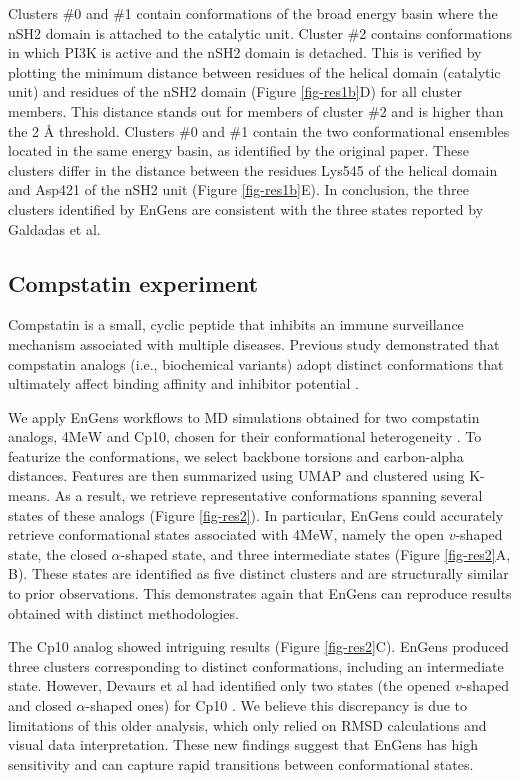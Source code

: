 \documentclass[unnumsec,webpdf,contemporary,large,numsquare]{oup-authoring-template}%
\theoremstyle{thmstyleone}%
\theoremstyle{thmstyletwo}%
\theoremstyle{thmstylethree}%
\begin{document}
Clusters \#0 and \#1 contain conformations of the broad energy basin where the nSH2 domain is attached to the catalytic unit. Cluster \#2 contains conformations in which PI3K is active and the nSH2 domain is detached. This is verified by plotting the minimum distance between residues of the helical domain (catalytic unit) and residues of the nSH2 domain (Figure \ref{fig-res1b}D) for all cluster members. This distance stands out for members of cluster \#2 and is higher than the 2 Å threshold.  Clusters \#0 and \#1 contain the two conformational ensembles located in the same energy basin, as identified by the original paper. These clusters differ in the distance between the residues Lys545 of the helical domain and Asp421 of the nSH2 unit (Figure \ref{fig-res1b}E).  In conclusion, the three clusters identified by EnGens are consistent with the three states reported by Galdadas et al.
 
\subsection{Compstatin experiment}

Compstatin is a small, cyclic peptide that inhibits an immune surveillance mechanism associated with multiple diseases. Previous study demonstrated that compstatin analogs (i.e., biochemical variants) adopt distinct conformations that ultimately affect binding affinity and inhibitor potential \citep{devaurs_computational_2020}. 

We apply EnGens workflows to MD simulations obtained for two compstatin analogs, 4MeW and Cp10, chosen for their conformational heterogeneity \citep{devaurs_computational_2020}. To featurize the conformations, we select backbone torsions and carbon-alpha distances. Features are then summarized using UMAP and clustered using K-means. As a result, we retrieve representative conformations spanning several states of these analogs (Figure \ref{fig-res2}). In particular, EnGens could accurately retrieve conformational states associated with 4MeW, namely the open $v$-shaped state, the closed $\alpha$-shaped state, and three intermediate states (Figure \ref{fig-res2}A, B). These states are identified as five distinct clusters and are structurally similar to prior observations. This demonstrates again that EnGens can reproduce results obtained with distinct methodologies. 

The Cp10 analog showed intriguing results (Figure \ref{fig-res2}C). EnGens produced three clusters corresponding to distinct conformations, including an intermediate state. However, Devaurs et al had identified only two states (the opened $v$-shaped  and closed $\alpha$-shaped ones) for Cp10 \citep{devaurs_computational_2020}. We believe this discrepancy is due to limitations of this older analysis, which only relied on RMSD calculations and visual data interpretation. These new findings suggest that EnGens has high sensitivity and can capture rapid transitions between conformational states.
\end{document}
